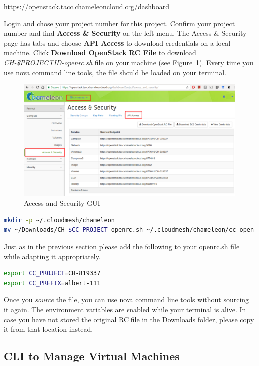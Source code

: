\url{https://openstack.tacc.chameleoncloud.org/dashboard}

Login and chose your project number for this project.  Confirm your
project number and find \textbf{Access \& Security} on the left menu.
The Access \& Security page has tabs and choose \textbf{API Access} to
download credentials on a local machine. Click \textbf{Download
  OpenStack RC File} to download \textit{CH-\$PROJECTID-openrc.sh}
file on your machine (see Figure~\ref{F:cc-gui}). Every time you use nova
command line tools, the file should be loaded on your terminal.


\begin{figure}[!htbp]
  \centering 
  \includegraphics[width=0.6\columnwidth]{section/cloud/chameleon/images/openstack-chameleon-openrc.png}
  \caption{Access and Security GUI}\label{F:cc-gui}
\end{figure}


\begin{lstlisting}[language=bash]
mkdir -p ~/.cloudmesh/chameleon
mv ~/Downloads/CH-$CC_PROJECT-openrc.sh ~/.cloudmesh/chameleon/cc-openrc.sh
\end{lstlisting}

Just as in the previous section please add the following to your
openrc.sh file while adapting it appropriately.

\begin{lstlisting}[language=bash]
export CC_PROJECT=CH-819337
export CC_PREFIX=albert-111
\end{lstlisting}

Once you \textit{source} the file, you can use nova command line tools
without sourcing it again.  The environment variables are enabled
while your terminal is alive. In case you have not stored the original
RC file in the Downloads folder, please copy it from that location
instead.

\subsection{CLI to Manage Virtual Machines}

